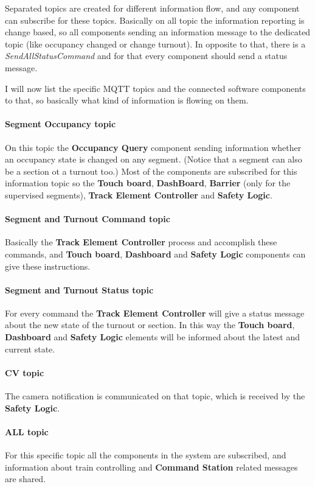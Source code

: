 Separated topics are created for different information flow, and any component can subscribe for these topics. Basically on all topic the information reporting is change based, so all components sending an information message to the dedicated topic (like occupancy changed or change turnout). In opposite to that, there is a \textit{SendAllStatusCommand} and for that every component should send a status message.

I will now list the specific MQTT topics and the connected software components to that, so basically what kind of information is flowing on them.

\paragraph{Segment Occupancy topic}
On this topic the \textbf{Occupancy Query} component sending information whether an occupancy state is changed on any segment. (Notice that a segment can also be a section ot a turnout too.) Most of the components are subscribed for this information topic so the \textbf{Touch board}, \textbf{DashBoard}, \textbf{Barrier} (only for the supervised segments), \textbf{Track Element Controller} and \textbf{Safety Logic}.

\paragraph{Segment and Turnout Command topic}
Basically the \textbf{Track Element Controller} process and accomplish these commands, and \textbf{Touch board}, \textbf{Dashboard} and \textbf{Safety Logic} components can give these instructions.

\paragraph{Segment and Turnout Status topic}
For every command the \textbf{Track Element Controller} will give a status message about the new state of the turnout or section. In this way the \textbf{Touch board}, \textbf{Dashboard} and \textbf{Safety Logic} elements will be informed about the latest and current state.

\paragraph{CV topic}
The camera notification is communicated on that topic, which is received by the \textbf{Safety Logic}.

\paragraph{ALL topic}
For this specific topic all the components in the system are subscribed, and information about train controlling and \textbf{Command Station} related messages are shared.

